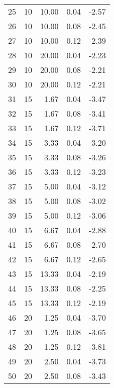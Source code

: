 \begin{tabular}{rrrrr}
    25 &        10 &  10.00 & 0.04 &                  -2.57 \\
    26 &        10 &  10.00 & 0.08 &                  -2.45 \\
    27 &        10 &  10.00 & 0.12 &                  -2.39 \\
    28 &        10 &  20.00 & 0.04 &                  -2.23 \\
    29 &        10 &  20.00 & 0.08 &                  -2.21 \\
    30 &        10 &  20.00 & 0.12 &                  -2.21 \\
    31 &        15 &   1.67 & 0.04 &                  -3.47 \\
    32 &        15 &   1.67 & 0.08 &                  -3.41 \\
    33 &        15 &   1.67 & 0.12 &                  -3.71 \\
    34 &        15 &   3.33 & 0.04 &                  -3.20 \\
    35 &        15 &   3.33 & 0.08 &                  -3.26 \\
    36 &        15 &   3.33 & 0.12 &                  -3.23 \\
    37 &        15 &   5.00 & 0.04 &                  -3.12 \\
    38 &        15 &   5.00 & 0.08 &                  -3.02 \\
    39 &        15 &   5.00 & 0.12 &                  -3.06 \\
    40 &        15 &   6.67 & 0.04 &                  -2.88 \\
    41 &        15 &   6.67 & 0.08 &                  -2.70 \\
    42 &        15 &   6.67 & 0.12 &                  -2.65 \\
    43 &        15 &  13.33 & 0.04 &                  -2.19 \\
    44 &        15 &  13.33 & 0.08 &                  -2.25 \\
    45 &        15 &  13.33 & 0.12 &                  -2.19 \\
    46 &        20 &   1.25 & 0.04 &                  -3.70 \\
    47 &        20 &   1.25 & 0.08 &                  -3.65 \\
    48 &        20 &   1.25 & 0.12 &                  -3.81 \\
    49 &        20 &   2.50 & 0.04 &                  -3.73 \\
    50 &        20 &   2.50 & 0.08 &                  -3.43 \\

\end{tabular}
